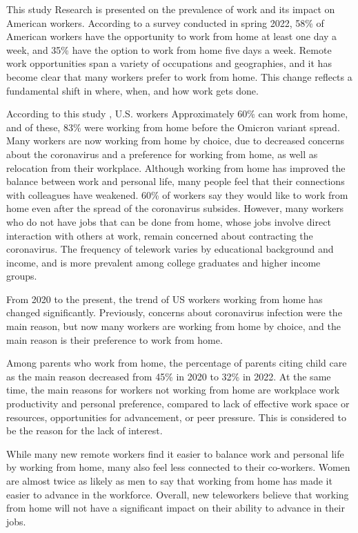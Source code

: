 \documentclass[12pt]{article}
\begin{document}
This study \cite{ref14}
Research is presented on the prevalence of work and its impact on American
workers. According to a survey conducted in spring 2022, 58\% of American
workers have the opportunity to work from home at least one day a week, and
35\% have the option to work from home five days a week. Remote work
opportunities span a variety of occupations and geographies, and it has become
clear that many workers prefer to work from home. This change reflects a
fundamental shift in where, when, and how work gets done.

According to this study \cite{ref15}, U.S. workers Approximately 60\% can work
from home, and of these, 83\% were
working from home before the Omicron variant spread. Many workers are now
working from home by choice, due to decreased concerns about the coronavirus
and a preference for working from home, as well as relocation from their
workplace. Although working from home has improved the balance between work and
personal life, many people feel that their connections with colleagues have
weakened. 60\% of workers say they would like to work from home even after the
spread of the coronavirus subsides. However, many workers who do not have jobs
that can be done from home, whose jobs involve direct interaction with others
at work, remain concerned about contracting the coronavirus. The frequency of
telework varies by educational background and income, and is more prevalent
among college graduates and higher income groups.

From 2020 to the present, the trend of US workers working from home has changed
significantly. Previously, concerns about coronavirus infection were the main
reason, but now many workers are working from home by choice, and the main
reason is their preference to work from home.

Among parents who work from home, the percentage of parents citing child care
as the main reason decreased from 45\% in 2020 to 32\% in 2022. At the same
time, the main reasons for workers not working from home are workplace work
productivity and personal preference, compared to lack of effective work space
or resources, opportunities for advancement, or peer pressure. This is
considered to be the reason for the lack of interest.

While many new remote workers find it easier to balance work and personal life
by working from home, many also feel less connected to their co-workers. Women
are almost twice as likely as men to say that working from home has made it
easier to advance in the workforce. Overall, new teleworkers believe that
working from home will not have a significant impact on their ability to
advance in their jobs.
\end{document}
